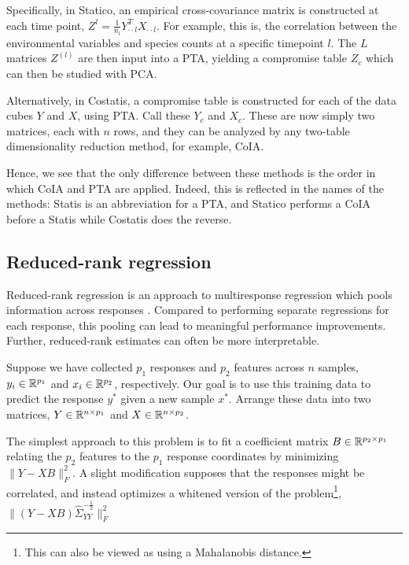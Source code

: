 \documentclass[14pt]{extarticle}
\begin{document}
Specifically, in Statico, an empirical cross-covariance matrix is constructed at
each time point, $Z^{l} = \frac{1}{n_{l}}Y^{T}_{\cdot\cdot l}X_{\cdot \cdot l}$.
For example, this is, the correlation between the environmental variables and
species counts at a specific timepoint $l$. The $L$ matrices $Z^{(l)}$ are then
input into a PTA, yielding a compromise table $Z_{c}$ which can then be studied
with PCA.

Alternatively, in Costatis, a compromise table is constructed for each of the
data cubes $Y$ and $X$, using PTA. Call these $Y_{c}$ and $X_{c}$. These are now
simply two matrices, each with $n$ rows, and they can be analyzed by any
two-table dimensionality reduction method, for example, CoIA.

Hence, we see that the only difference between these methods is the order in
which CoIA and PTA are applied. Indeed, this is reflected in the names of the
methods: Statis is an abbreviation for a PTA, and Statico performs a CoIA before
a Statis while Costatis does the reverse.

\subsection{Reduced-rank regression}
\label{subsec:label}

Reduced-rank regression is an approach to multiresponse regression which pools
information across responses \citep{izenman1975reduced, mukherjee2011reduced}.
Compared to performing separate regressions for each response, this pooling can
lead to meaningful performance improvements. Further, reduced-rank estimates can
often be more interpretable.

Suppose we have collected $p_{1}$ responses and $p_{2}$ features across $n$
samples, $y_{i} \in \mathbb{R}^{p_{1}}$ and $x_{i} \in \mathbb{R}^{p_{2}}$,
respectively. Our goal is to use this training data to predict the response
$y^{\ast}$ given a new sample $x^{\ast}$. Arrange these data into two matrices,
$Y \in \mathbb{R}^{n \times p_{1}}$ and $X \in \mathbb{R}^{n \times p_{2}}$.

The simplest approach to this problem is to fit a coefficient matrix $B \in
\mathbb{R}^{p_{2} \times p_{1}}$ relating the $p_{2}$ features to the $p_{1}$
response coordinates by minimizing $\|Y - XB\|_{F}^{2}$. A slight modification
supposes that the responses might be correlated, and instead optimizes a
whitened version of the problem\footnote{This can also be viewed as using a
  Mahalanobis distance.}, $\|\left(Y -
XB\right)\hat{\Sigma}_{YY}^{-\frac{1}{2}}\|_{F}^{2}$
\end{document}
